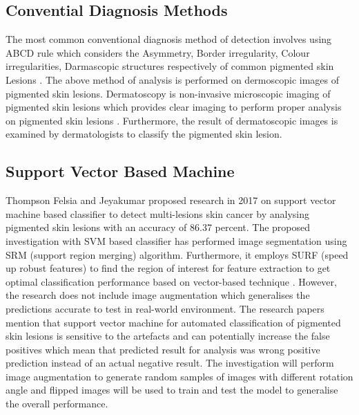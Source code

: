 \subsection{Convential Diagnosis Methods}

The most common conventional diagnosis method of detection involves
using ABCD rule which considers the Asymmetry, Border irregularity, Colour
irregularities,  Darmascopic structures respectively of common pigmented skin
Lesions \citep*{LOESCHER2013170}. The above method of analysis is performed on dermoscopic images of pigmented 
skin lesions.  Dermatoscopy is non-invasive microscopic imaging of
 pigmented skin lesions which provides clear imaging to perform 
 proper analysis on pigmented skin lesions \citep*{LOESCHER2013170}. 
 Furthermore, the result of dermatoscopic images is examined 
 by dermatologists to classify the pigmented skin lesion.  

\subsection{Support Vector Based Machine}
Thompson Felsia and Jeyakumar proposed research in 2017 on 
support vector machine based classifier to detect multi-lesions skin cancer by analysing pigmented skin lesions with an accuracy of 86.37 percent.
The proposed investigation with SVM based classifier has performed image segmentation using SRM (support region merging) algorithm. Furthermore, it employs SURF (speed up robust features) to find the region 
of interest for feature extraction to get optimal classification performance based on vector-based technique \citep*{thompson2017vector}. 
However, the research does not include image augmentation which generalises the predictions accurate to test in 
real-world environment. The research papers mention that support vector machine for automated classification of pigmented skin lesions is sensitive to the artefacts and can 
potentially increase the false positives which mean that predicted result for analysis was wrong positive prediction instead of an actual negative result. The investigation will perform image augmentation to generate random 
samples of images with different rotation angle and flipped images will be used to train and test the model to generalise the overall performance.

